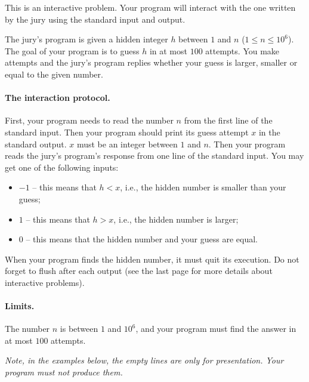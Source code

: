 
This is an interactive problem.
Your program will interact with the one written by the jury using the standard input and output.

The jury’s program is given a hidden integer $h$ between $1$ and $n$ ($1 \leq n \leq 10^6$).
The goal of your program is to guess $h$ in at most $100$ attempts.
You make attempts and the jury's program replies whether your guess is larger, smaller or equal to the given number.

\paragraph{The interaction protocol.}
First, your program needs to read the number $n$ from the first line of the standard input.
Then your program should print its guess attempt $x$ in the standard output.
$x$ must be an integer between $1$ and $n$.
Then your program reads the jury’s program’s response from one line of the standard input.
You may get one of the following inputs:
\begin{itemize}
    \item $-1$ -- this means that $h < x$, i.e., the hidden number is smaller than your guess;
    \item $1$ -- this means that $h > x$, i.e., the hidden number is larger;
    \item $0$ -- this means that the hidden number and your guess are equal.
\end{itemize}
When your program finds the hidden number, it must quit its execution.
Do not forget to flush after each output (see the last page for more details about interactive problems).

\paragraph{Limits.}
The number $n$ is between $1$ and $10^6$, and your program must find the answer in at most $100$ attempts.

\emph{Note, in the examples below, the empty lines are only for presentation.
Your program must not produce them.}
{
\renewcommand{\sampleinputname}{Jury's feedback}
\renewcommand{\sampleoutputname}{Your attempts}
}
